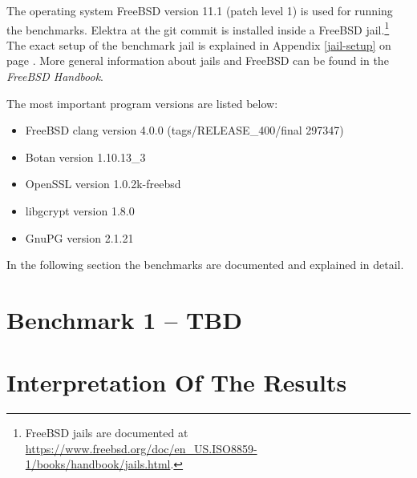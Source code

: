 The operating system FreeBSD version 11.1 (patch level 1) is used for running the benchmarks.
Elektra  at the git commit  is installed inside a FreeBSD jail.\footnote{FreeBSD jails
are documented at \url{https://www.freebsd.org/doc/en_US.ISO8859-1/books/handbook/jails.html}.
}
The exact setup of the benchmark jail is explained in Appendix \ref{jail-setup} on page \pageref{jail-setup}.
More general information about jails and FreeBSD can be found in the \emph{FreeBSD Handbook}.\cite{freebsd-doc}

The most important program versions are listed below:

\begin{itemize}
  \item FreeBSD clang version 4.0.0 (tags/RELEASE\_400/final 297347)
  \item Botan version 1.10.13\_3
  \item OpenSSL version 1.0.2k-freebsd
  \item libgcrypt version 1.8.0
  \item GnuPG version 2.1.21
\end{itemize}

In the following section the benchmarks are documented and explained in detail.

\section{Benchmark 1 -- TBD}

\section{Interpretation Of The Results}
